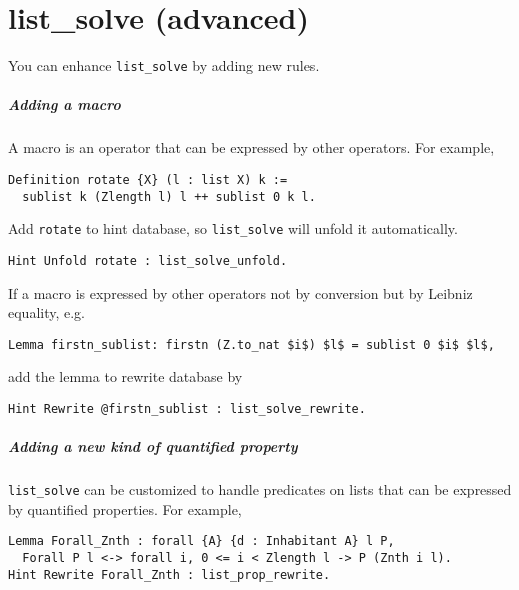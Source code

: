 \documentclass[12pt,fleqn,openany,oneside,showtrims]{memoir}
\begin{document}
\chapter{list\_solve (advanced)}
\label{refcard:list_solve-advanced}
You can enhance \lstinline{list_solve} by adding new rules.

\paragraph{Adding a macro} A macro is an operator that can be expressed by other operators.
For example,
\begin{lstlisting}
Definition rotate {X} (l : list X) k :=
  sublist k (Zlength l) l ++ sublist 0 k l.
\end{lstlisting}
\vspace{-\baselineskip}
Add \lstinline{rotate} to hint database, so \lstinline{list_solve} will unfold it automatically.
\begin{lstlisting}
Hint Unfold rotate : list_solve_unfold.
\end{lstlisting}
\vspace{-\baselineskip}
If a macro is expressed by other operators not by conversion but by Leibniz equality, e.g.
\begin{lstlisting}
Lemma firstn_sublist: firstn (Z.to_nat $i$) $l$ = sublist 0 $i$ $l$,
\end{lstlisting}
\vspace{-\baselineskip}
add the lemma to rewrite database by
\begin{lstlisting}
Hint Rewrite @firstn_sublist : list_solve_rewrite.
\end{lstlisting}

\paragraph{Adding a new kind of quantified property}
\lstinline{list_solve} can be customized to handle predicates on lists that can be expressed by quantified properties. For example,
\begin{lstlisting}
Lemma Forall_Znth : forall {A} {d : Inhabitant A} l P,
  Forall P l <-> forall i, 0 <= i < Zlength l -> P (Znth i l).
Hint Rewrite Forall_Znth : list_prop_rewrite.
\end{lstlisting}

\begin{comment}
\paragraph{Add a new extentionality rule}
\lstinline{list_solve} handles equalities of lists and entailments of array contents by applying extentionality to reduce the goal to relationship between elements.
\end{comment}
\end{document}
